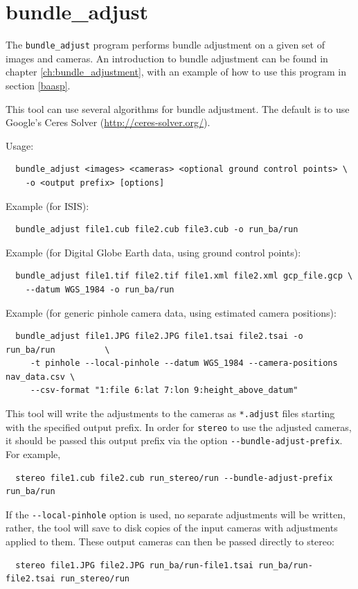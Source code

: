 \newpage
\section{bundle\_adjust}
\label{bundleadjust}

The \texttt{bundle\_adjust} program performs bundle adjustment on a
given set of images and cameras. An introduction to bundle adjustment
can be found in chapter \ref{ch:bundle_adjustment}, with an example of
how to use this program in section \ref{baasp}.

This tool can use several algorithms for bundle adjustment. The default is
to use Google's Ceres Solver (\url{http://ceres-solver.org/}).

Usage:
\begin{verbatim}
  bundle_adjust <images> <cameras> <optional ground control points> \
    -o <output prefix> [options]
\end{verbatim}

Example (for ISIS):
\begin{verbatim}
  bundle_adjust file1.cub file2.cub file3.cub -o run_ba/run
\end{verbatim}

Example (for Digital Globe Earth data, using ground control points):
\begin{verbatim}
  bundle_adjust file1.tif file2.tif file1.xml file2.xml gcp_file.gcp \
    --datum WGS_1984 -o run_ba/run
\end{verbatim}

Example (for generic pinhole camera data, using estimated camera positions):
\begin{verbatim}
  bundle_adjust file1.JPG file2.JPG file1.tsai file2.tsai -o run_ba/run          \
     -t pinhole --local-pinhole --datum WGS_1984 --camera-positions nav_data.csv \
     --csv-format "1:file 6:lat 7:lon 9:height_above_datum"
\end{verbatim}

This tool will write the adjustments to the cameras as \texttt{*.adjust}
files starting with the specified output prefix. In order for
\texttt{stereo} to use the adjusted cameras, it should be passed
this output prefix via the option \texttt{-\/-bundle-adjust-prefix}. For example,
\begin{verbatim}
  stereo file1.cub file2.cub run_stereo/run --bundle-adjust-prefix run_ba/run
\end{verbatim}

If the \texttt{-\/-local-pinhole} option is used, no separate adjustments
will be written, rather, the tool will save to disk copies of the input
cameras with adjustments applied to them. These output cameras can then be
passed directly to stereo:
\begin{verbatim}
  stereo file1.JPG file2.JPG run_ba/run-file1.tsai run_ba/run-file2.tsai run_stereo/run
\end{verbatim} 

